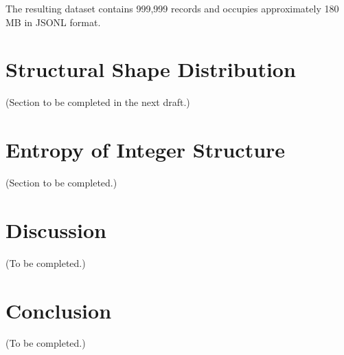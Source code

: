 \documentclass[11pt]{article}
\begin{document}
The resulting dataset contains 999,999 records and occupies approximately
180 MB in JSONL format.

\section{Structural Shape Distribution}

(Section to be completed in the next draft.)

\section{Entropy of Integer Structure}

(Section to be completed.)

\section{Discussion}

(To be completed.)

\section{Conclusion}

(To be completed.)
\end{document}
